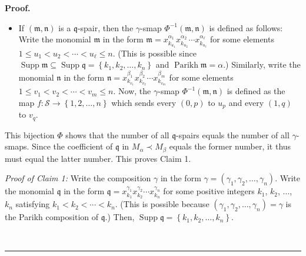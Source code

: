 \documentclass[numbers=enddot,12pt,final,onecolumn,notitlepage,abstracton]{scrartcl}%
\theoremstyle{definition}
\newenvironment{proof}[1][Proof]{\noindent\textbf{#1.} }{\ \rule{0.5em}{0.5em}}
\newenvironment{verlong}{}{}
\newenvironment{vershort}{}{}
\begin{document}
\begin{proof}
\begin{vershort}
\begin{itemize}
\item If $\left(  \mathfrak{m},\mathfrak{n}\right)  $ is a $\mathfrak{q}%
$-spair, then the $\gamma$-smap $\Phi^{-1}\left(  \mathfrak{m},\mathfrak{n}%
\right)  $ is defined as follows: Write the monomial $\mathfrak{m}$ in the
form $\mathfrak{m}=x_{k_{u_{1}}}^{\alpha_{1}}x_{k_{u_{2}}}^{\alpha_{2}}\cdots
x_{k_{u_{\ell}}}^{\alpha_{\ell}}$ for some elements $1\leq u_{1}<u_{2}%
<\cdots<u_{\ell}\leq n$. (This is possible since $\operatorname*{Supp}%
\mathfrak{m}\subseteq\operatorname*{Supp}\mathfrak{q}=\left\{  k_{1}%
,k_{2},\ldots,k_{n}\right\}  $ and $\operatorname*{Parikh}\mathfrak{m}=\alpha
$.) Similarly, write the monomial $\mathfrak{n}$ in the form $\mathfrak{n}%
=x_{k_{v_{1}}}^{\beta_{1}}x_{k_{v_{2}}}^{\beta_{2}}\cdots x_{k_{v_{m}}}%
^{\beta_{m}}$ for some elements $1\leq v_{1}<v_{2}<\cdots<v_{m}\leq n$. Now,
the $\gamma$-smap $\Phi^{-1}\left(  \mathfrak{m},\mathfrak{n}\right)  $ is
defined as the map $f:\mathcal{S}\rightarrow\left\{  1,2,\ldots,n\right\}  $
which sends every $\left(  0,p\right)  $ to $u_{p}$ and every $\left(
1,q\right)  $ to $v_{q}$.
\end{itemize}

This bijection $\Phi$ shows that the number of all $\mathfrak{q}$-spairs
equals the number of all $\gamma$-smaps. Since the coefficient of
$\mathfrak{q}$ in $M_{\alpha}\left.  \prec\right.  M_{\beta}$ equals the
former number, it thus must equal the latter number. This proves Claim 1.
\end{vershort}

\begin{verlong}
\textit{Proof of Claim 1:} Write the composition $\gamma$ in the form
$\gamma=\left(  \gamma_{1},\gamma_{2},\ldots,\gamma_{n}\right)  $. Write the
monomial $\mathfrak{q}$ in the form $\mathfrak{q}=x_{k_{1}}^{\gamma_{1}%
}x_{k_{2}}^{\gamma_{2}}\cdots x_{k_{n}}^{\gamma_{n}}$ for some positive
integers $k_{1}$, $k_{2}$, $\ldots$, $k_{n}$ satisfying $k_{1}<k_{2}%
<\cdots<k_{n}$. (This is possible because $\left(  \gamma_{1},\gamma
_{2},\ldots,\gamma_{n}\right)  =\gamma$ is the Parikh composition of
$\mathfrak{q}$.) Then, $\operatorname*{Supp}\mathfrak{q}=\left\{  k_{1}%
,k_{2},\ldots,k_{n}\right\}  $.


\end{verlong}
\end{proof}
\end{document}
